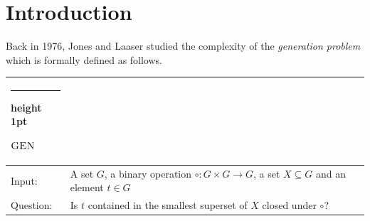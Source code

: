 \documentclass[11pt]{article}
\makeatletter
\numberwithin{equation}{section}
\theoremstyle{definition}
\theoremstyle{plain}
\newcommand{\FOLL}{\ensuremath{\mathsf{FOLL}}}
\newcommand{\AC}{\ensuremath{\mathsf{AC}}}
\newcommand{\qAC}{\ensuremath{\mathsf{qAC}}}
\newcommand{\LOGSPACE}{\ensuremath{\mathsf{Logspace}}}
\newcommand{\NL}{\ensuremath{\mathsf{NL}}}
\newcommand{\GEN}{\ensuremath{\textsc{GEN}}}
\newcommand{\Parity}{\ensuremath{\textsc{Parity}}}
\newcommand{\SCSM}{Cayley semigroup membership}
\newcommand{\SCSMP}{{\SCSM} problem}
\newcommand{\Hastad}{H{\aa}stad}
\newcommand{\thickhline}{%
    \noalign {\ifnum 0=`}\fi \hrule height 1pt
    \futurelet \reserved@a \@xhline
}
\makeatother
\begin{document}
\begin{abstract}
  The \emph{Cayley semigroup membership problem} asks, given a multiplication
  table representing a semigroup~$S$, a subset $X$ of $S$ and an element $t$ of
  $S$, whether $t$ can be expressed as a product of elements of $X$.
  It is well-known that this problem is $\NL$-complete
%
%
under $\AC^0$-reductions.  %
For groups, the problem can be solved in deterministic
$\LOGSPACE$.   %
This raised the question of determining the exact complexity of this variant.
  Barrington, Kadau, Lange and McKenzie showed that for Abelian groups and for
  certain solvable groups, the problem is contained in the complexity class
  $\FOLL$  %
  (polynomial-size, $O(\log\log n)$-depth circuits) %
  and they concluded that these variants are not hard,
  under $\AC^0$ reductions,  %
  for any complexity class containing the $\Parity$ language. The more
  general case of arbitrary groups remained open.
  In this %
  article,  %
  we apply results by Babai and Szemer\'edi directly to this
  setting to show that the problem is solvable in $\qAC^0$ (quasi-polynomial
  size circuits of constant depth with unbounded fan-in). We prove a similar
  result for commutative semigroups. Combined with the Yao--\Hastad\
  circuit lower bound,  %
  it follows immediately that {\SCSM} for groups and {\SCSM} for
  commutative semigroups are not hard,
  under $\AC^0$ reductions, %
  for any class containing $\Parity$.
  Moreover, we prove that $\NL$-completeness already holds for the classes
  of $0$-simple semigroups and nilpotent semigroups.
  Together with our results on groups and commutative semigroups, we prove the
  existence of a natural class of finite semigroups that generates a variety of
  finite semigroups with $\NL$-complete {\SCSM}, while the {\SCSMP} for the
  class itself is not $\NL$-hard.
  We also discuss applications of our technique to $\FOLL$ and describe
  varieties for which the {\SCSMP} is in $\AC^0$.
\end{abstract}

\section{Introduction}

Back in 1976, Jones and Laaser studied the complexity of the \emph{generation
problem} which is formally defined as follows.
\vspace{1em}

\noindent
\begin{tabularx}{\textwidth}{p{1.25cm}X}
  \thickhline
  $\GEN$ \\
  \hline
  \textsf{Input}: & A set $G$, a binary operation $\circ \colon G \times G \to G$, a set $X \subseteq G$ and an element $t \in G$ \\
  \textsf{Question}: & Is $t$ contained in the smallest
superset   %
of $X$ closed under $\circ$? \\
  \hline
\end{tabularx}
\vspace{1ex}
\end{document}
